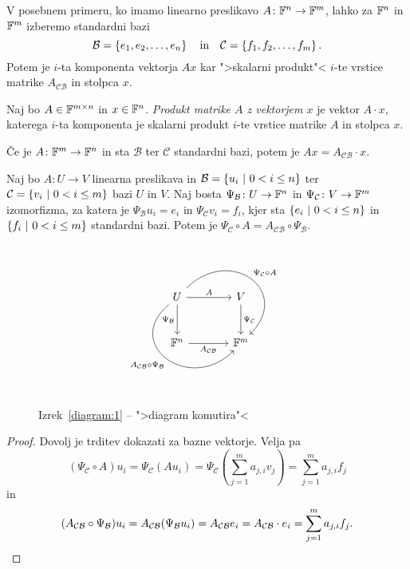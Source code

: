 \documentclass[12pt, a4paper]{article}
\begin{document}
\obvs

V posebnem primeru, ko imamo linearno preslikavo $A\colon\mathbb{F}^n\to\mathbb{F}^m$, lahko za $\mathbb{F}^n$ in $\mathbb{F}^m$ izberemo standardni bazi
\[
\mathcal{B}=\left\{e_1,e_2,\dots,e_n\right\}
\quad\text{in}\quad
\mathcal{C}=\left\{f_1,f_2,\dots,f_m\right\}.
\]
Potem je $i$-ta komponenta vektorja $Ax$ kar ">skalarni produkt"< $i$-te vrstice matrike $A_{\mathcal{CB}}$ in stolpca $x$.

\begin{definicija}
Naj bo $A\in\mathbb{F}^{m\times n}$ in $x\in\mathbb{F}^n$. \emph{Produkt matrike $A$ z vektorjem $x$} je vektor $A\cdot x$, katerega $i$-ta komponenta je skalarni produkt $i$-te vrstice matrike $A$ in stolpca $x$.
\end{definicija}

\begin{opomba}
Če je $A\colon\mathbb{F}^m\to\mathbb{F}^n$ in sta $\mathcal{B}$ ter $\mathcal{C}$ standardni bazi, potem je $Ax=A_{\mathcal{CB}}\cdot x$.
\end{opomba}

\begin{izrek}\label{diagram:1}
Naj bo $A\colon U\to V$ linearna preslikava in $\mathcal{B}=\left\{u_i~\middle\vert~0<i\leq n\right\}$ ter $\mathcal{C}=\left\{v_i~\middle\vert~0<i\leq m\right\}$ bazi $U$ in $V$. Naj bosta $\Psi_{\mathcal{B}}\colon U\to\mathbb{F}^n$ in $\Psi_{\mathcal{C}}\colon V\to\mathbb{F}^m$ izomorfizma, za katera je $\Psi_{\mathcal{B}}u_i=e_i$ in $\Psi_{\mathcal{C}}v_i=f_i$, kjer sta $\left\{e_i~\middle\vert~0<i\leq n\right\}$ in $\left\{f_i~\middle\vert~0<i\leq m\right\}$ standardni bazi. Potem je $\Psi_{\mathcal{C}}\circ A=A_{\mathcal{CB}}\circ\Psi_{\mathcal{B}}$.
\end{izrek}

\begin{figure}[H]
\[
\begin{tikzcd}[column sep=large, row sep=large]
U
\arrow[r, "A"]
\arrow[d, "\Psi_{\mathcal{B}}"']
\arrow[dr, out=45, in=45, looseness=2, "\Psi_{\mathcal{C}}\circ A"]
\arrow[dr, out=220, in=225, looseness=2, "A_{\mathcal{CB}}\circ \Psi_{\mathcal{B}}"'] & V \arrow[d, "\Psi_{\mathcal{C}}"] \\
\F^n \arrow[r, "A_{\mathcal{CB}}"'] & \F^m
\end{tikzcd}
\]
\caption{Izrek~\ref{diagram:1} -- ">diagram komutira"<}
\end{figure}

\begin{proof}
Dovolj je trditev dokazati za bazne vektorje. Velja pa
\[
(\Psi_{\mathcal{C}}\circ A)u_i=\Psi_{\mathcal{C}}(Au_i)
=\Psi_{\mathcal{C}}\left(\sum_{j=1}^m a_{j,i}v_j\right)
=\sum_{j=1}^m a_{j,i}f_j
\]
in
\[
(A_{\mathcal{CB}}\circ \Psi_{\mathcal{B}})u_i=A_{\mathcal{CB}}(\Psi_{\mathcal{B}}u_i)
=A_{\mathcal{CB}}e_i
=A_{\mathcal{CB}}\cdot e_i
=\sum_{j=1}^m a_{j,i}f_j.\qedhere
\]
\end{proof}
\end{document}
